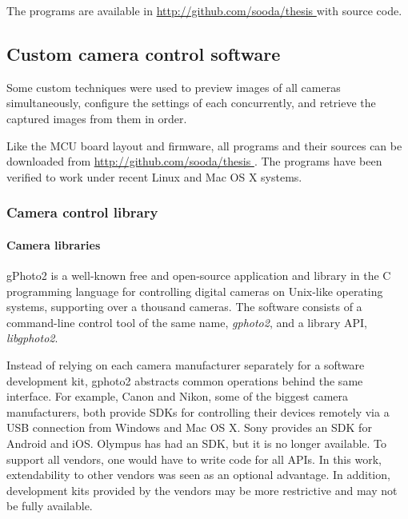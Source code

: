 The programs are available in \url { http://github.com/sooda/thesis } with source code.


\subsection{Custom camera control software} %



Some custom techniques were used to preview images of all cameras simultaneously, configure the settings of each concurrently, and retrieve the captured images from them in order.

Like the MCU board layout and firmware, all programs and their sources can be downloaded from \url { http://github.com/sooda/thesis }.
The programs have been verified to work under recent Linux and Mac OS X systems.


\subsubsection{Camera control library} %

\paragraph{Camera libraries}
gPhoto2 \cite{gphoto2} is a well-known free and open-source application and library in the C programming language for controlling digital cameras on Unix-like operating systems, supporting over a thousand cameras.
The software consists of a command-line control tool of the same name, \emph{gphoto2}, and a library API, \emph{libgphoto2}.

Instead of relying on each camera manufacturer separately for a software development kit, gphoto2 abstracts common operations behind the same interface.
For example, Canon and Nikon, some of the biggest camera manufacturers, both provide SDKs for controlling their devices remotely via a USB connection from Windows and Mac OS X. \cite{canonedsdk} \cite{nikonsdk}
Sony provides an SDK for Android and iOS. \cite{sonysdk}
Olympus has had an SDK, but it is no longer available. \cite{olympussdk}
To support all vendors, one would have to write code for all APIs.
In this work, extendability to other vendors was seen as an optional advantage.
In addition, development kits provided by the vendors may be more restrictive and may not be fully available.

